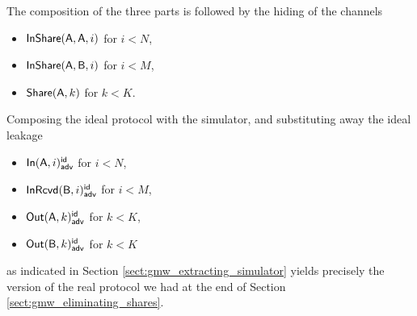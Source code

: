 \noindent The composition of the three parts is followed by the hiding of the channels
\begin{itemize}
\item $\mathsf{InShare}(\mathsf{A},\mathsf{A},i)$ for $i < N$,
\item $\mathsf{InShare}(\mathsf{A},\mathsf{B},i)$ for $i < M$,
\item $\mathsf{Share}(\mathsf{A},k)$ for $k < K$.
\end{itemize}

\noindent Composing the ideal protocol with the simulator, and substituting away the ideal leakage
\begin{itemize}
\item $\mathsf{In}(\mathsf{A},i)^{\mathsf{id}}_{\mathsf{adv}}$ for $i < N$,
\item $\mathsf{InRcvd}(\mathsf{B},i)^{\mathsf{id}}_{\mathsf{adv}}$ for $i < M$,
\item $\mathsf{Out}(\mathsf{A},k)^{\mathsf{id}}_{\mathsf{adv}}$ for $k < K$,
\item $\mathsf{Out}(\mathsf{B},k)^{\mathsf{id}}_{\mathsf{adv}}$ for $k < K$
\end{itemize}
as indicated in Section \ref{sect:gmw_extracting_simulator} yields precisely the version of the real protocol we had at the end of Section \ref{sect:gmw_eliminating_shares}.
